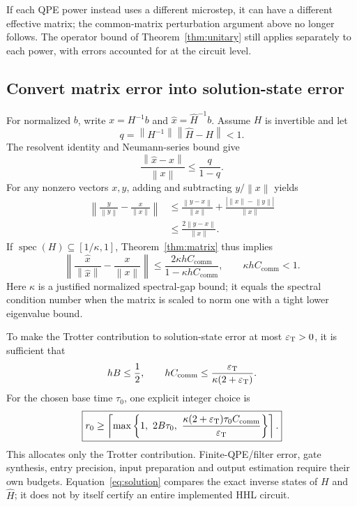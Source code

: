 \documentclass[11pt,a4paper]{article}
\newcommand{\norm}[1]{\left\lVert #1\right\rVert}
\newcommand{\CC}{C_{\mathrm{comm}}}
\begin{document}
If each QPE power instead uses a different microstep, it can have a different effective matrix; the common-matrix perturbation argument above no longer follows. The operator bound of Theorem~\ref{thm:unitary} still applies separately to each power, with errors accounted for at the circuit level.

\subsection{Convert matrix error into solution-state error}
For normalized $b$, write $x=H^{-1}b$ and $\widehat x=\widehat H^{-1}b$. Assume $H$ is invertible and let
\begin{equation}
 q=\norm{H^{-1}}\norm{\widehat H-H}<1.
\end{equation}
The resolvent identity and Neumann-series bound give
\begin{equation}
 \frac{\norm{\widehat x-x}}{\norm x}\leq\frac{q}{1-q}.
\end{equation}
For any nonzero vectors $x,y$, adding and subtracting $y/\norm x$ yields
\begin{align}
 \norm{\frac{y}{\norm y}-\frac{x}{\norm x}}
 &\leq\frac{\norm{y-x}}{\norm x}
       +\frac{|\norm x-\norm y|}{\norm x}\\
 &\leq\frac{2\norm{y-x}}{\norm x}.
\end{align}
If $\operatorname{spec}(H)\subseteq[1/\kappa,1]$, Theorem~\ref{thm:matrix} thus implies
\begin{equation}\label{eq:solution}
 \boxed{\norm{\frac{\widehat x}{\norm{\widehat x}}-
                   \frac{x}{\norm x}}
 \leq\frac{2\kappa h\CC}{1-\kappa h\CC},
 \qquad \kappa h\CC<1.}
\end{equation}
Here $\kappa$ is a justified normalized spectral-gap bound; it equals the spectral condition number when the matrix is scaled to norm one with a tight lower eigenvalue bound.

To make the Trotter contribution to solution-state error at most $\varepsilon_{\rm T}>0$, it is sufficient that
\begin{equation}
 hB\leq\frac12,\qquad
 h\CC\leq\frac{\varepsilon_{\rm T}}{\kappa(2+\varepsilon_{\rm T})}.
\end{equation}
For the chosen base time $\tau_0$, one explicit integer choice is
\begin{equation}\label{eq:steps}
 \boxed{r_0\geq\left\lceil\max\left\{
 1,\ 2B\tau_0,\
 \frac{\kappa(2+\varepsilon_{\rm T})\tau_0\CC}{\varepsilon_{\rm T}}
 \right\}\right\rceil.}
\end{equation}
This allocates only the Trotter contribution. Finite-QPE/filter error, gate synthesis, entry precision, input preparation and output estimation require their own budgets. Equation~\eqref{eq:solution} compares the exact inverse states of $H$ and $\widehat H$; it does not by itself certify an entire implemented HHL circuit.
\end{document}

